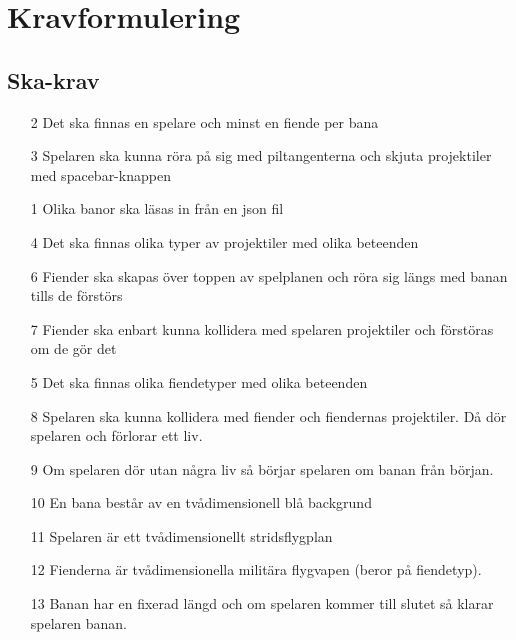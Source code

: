\documentclass{TDP005mall}
\begin{document}
\section{Kravformulering}
\subsection{Ska-krav}
\begin{enumerate}
  \item [2] Det ska finnas en spelare och minst en fiende per bana
  \item [3] Spelaren ska kunna röra på sig med piltangenterna och skjuta projektiler med spacebar-knappen
  \item [1] Olika banor ska läsas in från en json fil
  \item [4] Det ska finnas olika typer av projektiler med olika beteenden
  \item [6] Fiender ska skapas över toppen av spelplanen och röra sig längs med banan tills de förstörs
  \item [7] Fiender ska enbart kunna kollidera med spelaren projektiler och förstöras om de gör det
  \item [5] Det ska finnas olika fiendetyper med olika beteenden 
  \item [8] Spelaren ska kunna kollidera med fiender och fiendernas projektiler. 
        Då dör spelaren och förlorar ett liv.
  \item [9] Om spelaren dör utan några liv så börjar spelaren om banan från början.
  \item [10] En bana består av en tvådimensionell blå backgrund
  \item [11] Spelaren är ett tvådimensionellt stridsflygplan 
  \item [12] Fienderna är tvådimensionella militära flygvapen (beror på fiendetyp).
  \item [13] Banan har en fixerad längd och om spelaren kommer till slutet så klarar spelaren banan.
\end{enumerate}
\end{document}
